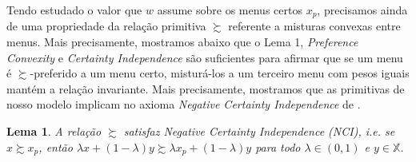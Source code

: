 \documentclass[12pt, a4paper]{article}
\theoremstyle{nonumberplain}
\theoremstyle{plain}
\theoremstyle{plain}
\theoremstyle{plain}
\newtheorem{lemma}{Lema}
\theoremstyle{nonumberplain}
\begin{document}
Tendo estudado o valor que $w$ assume sobre os menus certos $x_p$, precisamos ainda de uma propriedade da relação primitiva $\succsim$ referente a misturas convexas entre menus. Mais precisamente, mostramos abaixo que o Lema 1, \emph{Preference Convexity} e \emph{Certainty Independence} são suficientes para afirmar que se um menu é $\succsim$-preferido a um menu certo, misturá-los a um terceiro menu com pesos iguais mantém a relação invariante. Mais precisamente, mostramos que as primitivas de nosso modelo implicam no axioma \emph{Negative Certainty Independence} de \cite{Dil2010}.

\begin{lemma}\label{NCI}A relação $\succsim$ satisfaz \emph{Negative Certainty Independence (NCI)}, i.e. se $x\succsim x_p$, então $\lambda x +(1-\lambda)y\succsim \lambda x_p +(1-\lambda)y$ para todo $\lambda\in(0,1)$ e $y\in \mathbb{X}$.\end{lemma}
\end{document}
